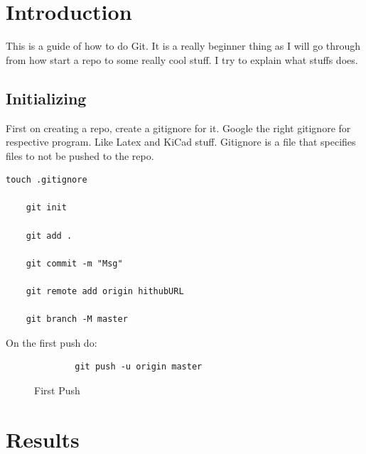 \documentclass[12pt]{report} %
\begin{document}
\listoffigures
\newpage

\listoftables
{}
\newpage

\setcounter{page}{1}


\chapter{Introduction}
This is a guide of how to do Git. It is a really beginner thing as I will go through from how start a repo to some really cool stuff. I try to explain what stuffs does. 

\section{Initializing}

First on creating a repo, create a gitignore for it. Google the right gitignore for respective program. Like Latex and KiCad stuff. Gitignore is a file that specifies files to not be pushed to the repo. 


\begin{lstlisting}[caption={Commands for init first repo},captionpos=b]
	touch .gitignore

	git init 
	
	git add .
	
	git commit -m "Msg"
	
	git remote add origin hithubURL
	
	git branch -M master
\end{lstlisting}

On the first push do:
\begin{figure}[H]
	\begin{lstlisting}
		git push -u origin master
	\end{lstlisting}
	\label{firstPush}
	\caption{First Push}
\end{figure}



\chapter{Results} %
\end{document}
